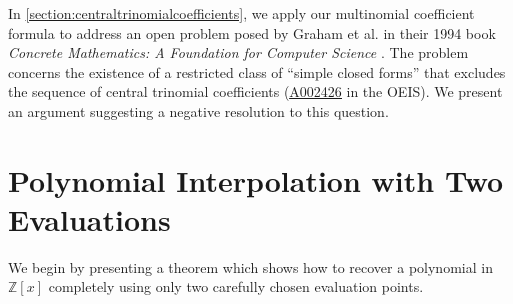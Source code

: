 \documentclass[10pt,a4paper]{article}
\theoremstyle{plain}
\newcommand{\seqnum}[1]{\href{https://oeis.org/#1}{\rm \underline{#1}}}
\begin{document}
In \cref{section:centraltrinomialcoefficients}, we apply our multinomial coefficient formula to address an open problem posed by Graham et al. in their 1994 book \textit{Concrete Mathematics: A Foundation for Computer Science} \cite{graham1994concrete}. The problem concerns the existence of a restricted class of ``simple closed forms'' that excludes the sequence of central trinomial coefficients (\seqnum{A002426} in the OEIS). We present an argument suggesting a negative resolution to this question.

\section{Polynomial Interpolation with Two Evaluations} \label{section:interpolation}
We begin by presenting a theorem which shows how to recover a polynomial in $\mathbb{Z}[x]$ completely using only two carefully chosen evaluation points.
\end{document}
